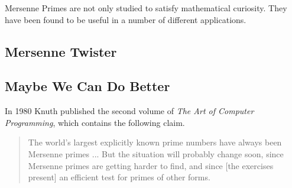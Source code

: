 Mersenne Primes are not only studied to satisfy mathematical curiosity.  They have been found to be useful in a number of different applications.  

\subsection{Mersenne Twister}

\subsection{Maybe We Can Do Better}
\label{sec:knuth}
In 1980 Knuth published the second volume of \emph{The Art of Computer Programming}, which contains the following claim.

\begin{quote}
The world’s largest explicitly known prime numbers have always been Mersenne primes ... But the situation will probably change soon, since Mersenne primes are getting harder to find, and since [the exercises present] an efficient test for primes of other forms. \cite{taocp}
\end{quote}

